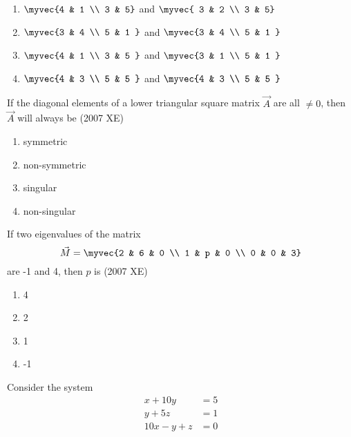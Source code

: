     \begin{multicols}{2}
    \begin{enumerate}
        \item $\myvec{4 & 1 \\ 3 & 5}$ and $\myvec{ 3 & 2 \\ 3 & 5}$
        \item $\myvec{3 & 4 \\ 5 & 1 }$ and $\myvec{3 & 4 \\ 5 & 1 }$
        \item $\myvec{4 & 1 \\ 3 & 5 }$ and $\myvec{3 & 1 \\ 5 & 1 }$
        \item $\myvec{4 & 3 \\ 5 & 5 }$ and $\myvec{4 & 3 \\ 5 & 5 }$
    \end{enumerate}
\end{multicols}
    \item If the diagonal elements of a lower triangular square matrix $\vec{A}$ are all $\neq 0$, then $\vec{A}$ will always be
    \hfill{(2007 XE)}
    \begin{multicols}{4}
    \begin{enumerate}
        \item symmetric
        \item non-symmetric
        \item singular
        \item non-singular
    \end{enumerate}
\end{multicols}
    \item If two eigenvalues of the matrix $$\vec{M} = \myvec{2 & 6 & 0 \\ 1 & p & 0 \\ 0 & 0 & 3}$$ are -1 and 4, then $p$ is
    \hfill{(2007 XE)}
    \begin{multicols}{4}
    \begin{enumerate}
        \item 4
        \item 2
        \item 1
        \item -1
    \end{enumerate}
\end{multicols}
    \item Consider the system
	    \begin{align*}
	     x + 10y &= 5 \\ y + 5z &= 1 \\ 10x - y + z &= 0
     \end{align*}
